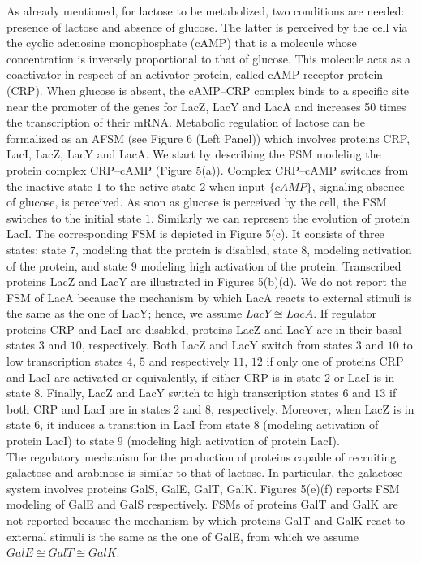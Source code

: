 \documentclass{amsart}
\theoremstyle{definition}
\theoremstyle{remark}
\numberwithin{equation}{section}
\begin{document}
As already mentioned, for lactose to be metabolized, two conditions are needed: presence of lactose and absence of glucose. The latter is perceived by the cell via the cyclic adenosine monophosphate (cAMP) that is a molecule whose concentration is inversely proportional to that of glucose. This molecule acts as a coactivator in respect of an activator protein, called cAMP receptor protein (CRP). When glucose is absent, the cAMP--CRP complex binds to a specific site near the promoter of the genes for LacZ, LacY and LacA and increases 50 times the transcription of their mRNA. 
Metabolic regulation of lactose can be formalized as an AFSM (see Figure 6 (Left Panel)) which involves proteins CRP, LacI, LacZ, LacY and LacA. 
We start by describing the FSM modeling the protein complex CRP--cAMP (Figure 5(a)). Complex CRP--cAMP switches from the inactive state $1$ to the active state $2$ when input $\{cAMP\}$, signaling absence of glucose, is perceived. As soon as glucose is perceived by the cell, the FSM switches to the initial state $1$. 
Similarly we can represent the evolution of protein LacI. The corresponding FSM is depicted in Figure 5(c). It consists of three states: state $7$, modeling that the protein is disabled, state $8$, modeling activation of the protein, and state $9$ modeling high activation of the protein. 
Transcribed proteins LacZ and LacY are illustrated in Figures 5(b)(d). We do not report the FSM of LacA because the mechanism by which LacA reacts to external stimuli is the same as the one of LacY; hence, we assume $LacY \cong LacA$. 
If regulator proteins CRP and LacI are disabled, proteins LacZ and LacY are in their basal states $3$ and $10$, respectively. Both LacZ and LacY switch from states $3$ and $10$ to low transcription states $4$, $5$ and respectively $11$, $12$ if only one of proteins CRP and LacI are activated or equivalently, if either CRP is in state $2$ or LacI is in state $8$. Finally, LacZ and LacY switch to high transcription states $6$ and $13$ if both CRP and LacI are in states $2$ and $8$, respectively. Moreover, when LacZ is in state $6$, it induces a transition in LacI from state $8$ (modeling activation of protein LacI) to state $9$ (modeling high activation of protein LacI). \\
The regulatory mechanism for the production of proteins capable of recruiting galactose and arabinose is similar to that of lactose. In particular, the galactose system involves proteins GalS, GalE, GalT, GalK. Figures 5(e)(f) reports FSM modeling of GalE and GalS respectively. FSMs of proteins GalT and GalK are not reported because the mechanism by which proteins GalT and GalK react to external stimuli is the same as the one of GalE, from which we assume $GalE \cong GalT \cong GalK$. 
\end{document}
